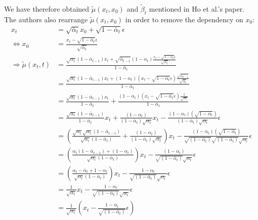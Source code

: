 \documentclass[twoside]{article}
\numberwithin{equation}{section}
\numberwithin{figure}{section}
\begin{document}
{
\allowdisplaybreaks \\
We have therefore obtained $\tilde{\mu}(x_t, x_0)$ and $\tilde{\beta}_t$ mentioned in Ho et al.'s \cite{ho2020denoising} paper. \\
The authors also rearrange $\tilde{\mu}(x_t, x_0)$ in order to remove the dependency on $x_0$: \\
  \begin{align}
    x_t &= \sqrt{\bar{\alpha}_t} x_0 + \sqrt{1 - \bar{\alpha}_t} \epsilon \\
    \Leftrightarrow x_0 &= \frac{x_t - \sqrt{1 - \bar{\alpha}_t} \epsilon}{\sqrt{\bar{\alpha}_t}} \\
    \Rightarrow \tilde{\mu}(x_t, t) &= \frac{\sqrt{\alpha_t}(1 - \bar{\alpha}_{t-1}) x_t + \sqrt{\bar{\alpha}_{t-1}}(1 - \alpha_t) \frac{x_t - \sqrt{1 - \bar{\alpha}_t} \epsilon}{\sqrt{\bar{\alpha}_t}}}{1 - \bar{\alpha}_t} \\
    &= \frac{\sqrt{\alpha_t}(1 - \bar{\alpha}_{t-1}) x_t + (1 - \alpha_t) \left(x_t - \sqrt{1 - \bar{\alpha}_t} \epsilon \right) \frac{\sqrt{\bar{\alpha}_{t-1}}}{\sqrt{\bar{\alpha}_t}}}{1 - \bar{\alpha}_t} \\
    &= \frac{\sqrt{\alpha_t}(1 - \bar{\alpha}_{t-1}) x_t}{{1 - \bar{\alpha}_t}} + \frac{(1 - \alpha_t) \left(x_t - \sqrt{1 - \bar{\alpha}_t} \epsilon \right) \frac{1}{\sqrt{\alpha_t}}}{1 - \bar{\alpha}_t} \\
    &= \frac{\sqrt{\alpha_t}(1 - \bar{\alpha}_{t-1})}{{1 - \bar{\alpha}_t}} x_t + \frac{(1 - \alpha_t)}{(1 - \bar{\alpha}_t) \sqrt{\alpha_t}} x_t - \frac{(1 - \alpha_t)(\sqrt{1 - \bar{\alpha}_t})}{(1 - \bar{\alpha}_t)\sqrt{\alpha_t}} \epsilon \\
    &= \left( \frac{\sqrt{\alpha_t} \sqrt{\alpha_t}(1 - \bar{\alpha}_{t-1})}{\sqrt{\alpha_t} ({1 - \bar{\alpha}_t})}+ \frac{(1 - \alpha_t)}{(1 - \bar{\alpha}_t) \sqrt{\alpha_t}} \right) x_t - \frac{(1 - \alpha_t)(\sqrt{1 - \bar{\alpha}_t})}{\sqrt{(1 - \bar{\alpha}_t)}\sqrt{(1 - \bar{\alpha}_t)}\sqrt{\alpha_t}} \epsilon \\
    &= \left( \frac{\alpha_t (1 - \bar{\alpha}_{t-1}) + (1 - \alpha_t)}{\sqrt{\alpha_t} ({1 - \bar{\alpha}_t})} \right) x_t - \frac{(1 - \alpha_t)}{\sqrt{(1 - \bar{\alpha}_t)}\sqrt{\alpha_t}} \epsilon \\
    &= \left( \frac{\alpha_t - \bar{\alpha}_{t} + 1 - \alpha_t}{\sqrt{\alpha_t} ({1 - \bar{\alpha}_t})} \right) x_t - \frac{1 - \alpha_t}{\sqrt{(1 - \bar{\alpha}_t)}\sqrt{\alpha_t}} \epsilon \\
    &= \frac{1}{\sqrt{\alpha_t}} x_t - \frac{1 - \alpha_t}{\sqrt{(1 - \bar{\alpha}_t)}\sqrt{\alpha_t}} \epsilon \\
    &= \frac{1}{\sqrt{\alpha_t}} \left( x_t - \frac{1 - \alpha_t}{\sqrt{(1 - \bar{\alpha}_t)}} \epsilon \right)
  \end{align}
}
\end{document}
